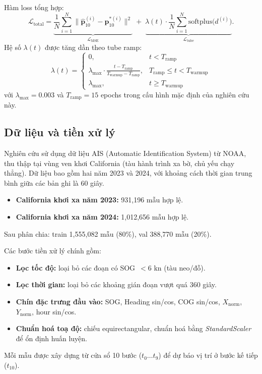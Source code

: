 \documentclass{IEEEtran}
\begin{document}
Hàm loss tổng hợp:
\[
\mathcal{L}_{\text{total}} = \underbrace{\frac{1}{N}\sum_{i=1}^N
  \|\hat{\mathbf{p}}_{10}^{(i)} - \mathbf{p}_{10}^{*(i)}\|^2}_{\mathcal{L}_{\text{MSE}}}
  \;+\;
  \underbrace{\lambda(t)\cdot\frac{1}{N}\sum_{i=1}^N
  \text{softplus}\!\bigl(d^{(i)}\bigr)}_{\mathcal{L}_{\text{tube}}}.
\]
Hệ số $\lambda(t)$ được tăng dần theo tube ramp:
\[
\lambda(t) =
\begin{cases}
  0, & t < T_{\text{ramp}}\\
  \lambda_{\max}\cdot\frac{t - T_{\text{ramp}}}{T_{\text{warmup}} - T_{\text{ramp}}},
    & T_{\text{ramp}} \leq t < T_{\text{warmup}}\\
  \lambda_{\max}, & t \geq T_{\text{warmup}}
\end{cases}
\]
với $\lambda_{\max}=0.003$ và $T_{\text{ramp}}=15$ epochs
trong cấu hình mặc định của nghiên cứu này.

\subsection{Dữ liệu và tiền xử lý}
Nghiên cứu sử dụng dữ liệu AIS (Automatic Identification System) từ NOAA,
thu thập tại vùng ven khơi California (tàu hành trình xa bờ, chủ yếu chạy thẳng).
Dữ liệu bao gồm hai năm 2023 và 2024,
với khoảng cách thời gian trung bình giữa các bản ghi là 60 giây.
\begin{itemize}
  \item \textbf{California khơi xa năm 2023:} 931{,}196 mẫu hợp lệ.
  \item \textbf{California khơi xa năm 2024:} 1{,}012{,}656 mẫu hợp lệ.
\end{itemize}
Sau phân chia: train 1{,}555{,}082 mẫu (80\%), val 388{,}770 mẫu (20\%).

Các bước tiền xử lý chính gồm:
\begin{itemize}
  \item \textbf{Lọc tốc độ:} loại bỏ các đoạn có SOG~$< 6$ kn (tàu neo/đỗ).
  \item \textbf{Lọc thời gian:} loại bỏ các khoảng gián đoạn vượt quá 360 giây.
  \item \textbf{Chín đặc trưng đầu vào:} SOG, Heading sin/cos, COG sin/cos,
        $X_{\text{norm}}$, $Y_{\text{norm}}$, hour sin/cos.
  \item \textbf{Chuẩn hoá toạ độ:} chiếu equirectangular, chuẩn hoá bằng
        \textit{StandardScaler} để ổn định huấn luyện.
\end{itemize}
Mỗi mẫu được xây dựng từ cửa sổ 10 bước ($t_0 \ldots t_9$)
để dự báo vị trí ở bước kế tiếp ($t_{10}$).
\end{document}
